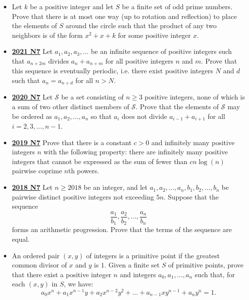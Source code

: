 \documentclass[11pt]{scrartcl}
\begin{document}
\begin{itemize}[leftmargin=*]
    \item  {} Let $k$ be a positive integer and let $S$ be a finite set of odd prime numbers. Prove that there is at most one way (up to rotation and reflection) to place the elements of $S$ around the circle such that the product of any two neighbors is of the form $x^2+x+k$ for some positive integer $x$.
\item  \href{https://artofproblemsolving.com/community/c6h2882548p25627533}{\textbf{2021 N7}} 	Let $a_1,a_2,a_3,\dots$ be an infinite sequence of positive integers such that $a_{n+2m}$ divides $a_{n}+a_{n+m}$ for all positive integers $n$ and $m.$ Prove that this sequence is eventually periodic, i.e. there exist positive integers $N$ and $d$ such that $a_n=a_{n+d}$ for all $n>N.$
\item  \href{https://artofproblemsolving.com/community/c6h2625921p22698513}{\textbf{2020 N7}} Let $\mathcal{S}$ be a set consisting of $n \geqslant  3$ positive integers, none of which is a sum of two other distinct members of $\mathcal{S}$. Prove that the elements of $\mathcal{S}$ may be ordered as $a_1, a_2, \dots, a_n$ so that $a_i$ does not divide $a_{i - 1} + a_{i + 1}$ for all $i = 2, 3, \dots, n - 1$.
\item  \href{https://artofproblemsolving.com/community/c6h2279001p17828757}{\textbf{2019 N7}} Prove that there is a constant $c>0$ and infinitely many positive integers $n$ with the following property: there are infinitely many positive integers that cannot be expressed as the sum of fewer than $cn\log(n)$ pairwise coprime $n$th powers.
\item  \href{https://artofproblemsolving.com/community/c6h1876776p12752855}{\textbf{2018 N7}} Let $n \geqslant  2018$ be an integer, and let $a_1, a_2, \dots, a_n, b_1, b_2, \dots, b_n$ be pairwise distinct positive integers not exceeding $5n$. Suppose that the sequence
\[ \frac{a_1}{b_1}, \frac{a_2}{b_2}, \dots, \frac{a_n}{b_n} \]forms an arithmetic progression. Prove that the terms of the sequence are equal.
\newpage
\item  {} An ordered pair $(x, y)$ of integers is a primitive point if the greatest common divisor of $x$ and $y$ is $1$. Given a finite set $S$ of primitive points, prove that there exist a positive integer $n$ and integers $a_0, a_1, \dots , a_n$ such that, for each $(x, y)$ in $S$, we have:
$$a_0x^n + a_1x^{n-1} y + a_2x^{n-2}y^2 + \dots + a_{n-1}xy^{n-1} + a_ny^n = 1.$$
 

\end{itemize}
\end{document}
